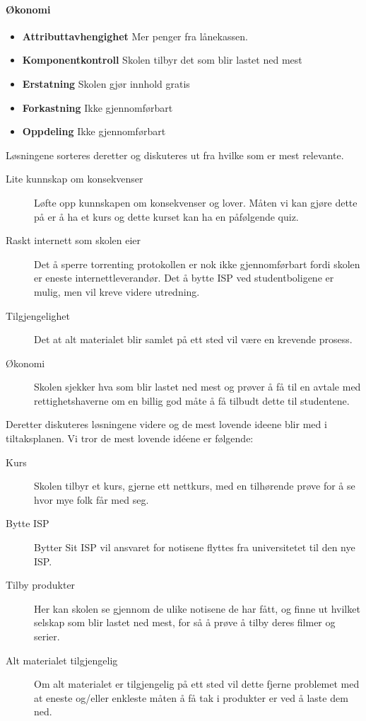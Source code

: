 \paragraph{Økonomi}
\begin{itemize}
    \item \textbf{Attributtavhengighet} Mer penger fra lånekassen. 
    \item \textbf{Komponentkontroll} Skolen tilbyr det som blir lastet ned mest
    \item \textbf{Erstatning} Skolen gjør innhold gratis
    \item \textbf{Forkastning} Ikke gjennomførbart
    \item \textbf{Oppdeling} Ikke gjennomførbart
\end{itemize}

Løsningene sorteres deretter og diskuteres ut fra hvilke som er mest relevante. 

\begin{description}
    \item[Lite kunnskap om konsekvenser] Løfte opp kunnskapen om konsekvenser og lover.  Måten vi kan gjøre dette på er å ha et kurs og dette kurset kan ha en påfølgende quiz.
    \item[Raskt internett som skolen eier] Det å sperre torrenting protokollen er nok ikke gjennomførbart fordi skolen er eneste internettleverandør. Det å bytte ISP ved studentboligene er mulig, men vil kreve videre utredning.
    \item[Tilgjengelighet] Det at alt materialet blir samlet på ett sted vil være en krevende prosess.
    \item[Økonomi] Skolen sjekker hva som blir lastet ned mest og prøver å få til en avtale med rettighetshaverne om en billig god måte å få tilbudt dette til studentene.
\end{description}

Deretter diskuteres løsningene videre og de mest lovende ideene blir med i tiltaksplanen. Vi tror de mest lovende idéene er følgende:

\begin{description}
    \item [Kurs] Skolen tilbyr et kurs, gjerne ett nettkurs, med en tilhørende prøve for å se hvor mye folk får med seg.
    \item [Bytte ISP] Bytter Sit ISP vil ansvaret for notisene flyttes fra universitetet til den nye ISP. 
    \item [Tilby produkter] Her kan skolen se gjennom de ulike notisene de har fått, og finne ut hvilket selskap som blir lastet ned mest, for så å prøve å tilby deres filmer og serier.
    \item [Alt materialet tilgjengelig] Om alt materialet er tilgjengelig på ett sted vil dette fjerne problemet med at eneste og/eller enkleste måten å få tak i produkter er ved å laste dem ned.
\end{description}


